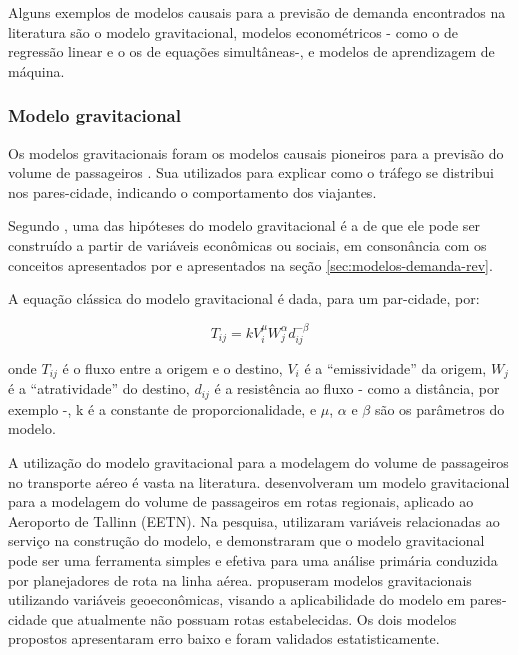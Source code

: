 \documentclass[a4paper,9pt,twocolumn,twoside,]{pinp}
\begin{document}
Alguns exemplos de modelos causais para a previsão de demanda
encontrados na literatura são o modelo gravitacional, modelos
econométricos - como o de regressão linear e o os de equações
simultâneas-, e modelos de aprendizagem de máquina.

\hypertarget{modelo-gravitacional}{%
\subsubsection{Modelo gravitacional}\label{modelo-gravitacional}}

Os modelos gravitacionais foram os modelos causais pioneiros para a
previsão do volume de passageiros \citep{grosche_gravity_2007}. Sua
utilizados para explicar como o tráfego se distribui nos pares-cidade,
indicando o comportamento dos viajantes.

Segundo \citet{grosche_gravity_2007}, uma das hipóteses do modelo
gravitacional é a de que ele pode ser construído a partir de variáveis
econômicas ou sociais, em consonância com os conceitos apresentados por
\citet{jorge-calderon_demand_1997} e
\citet{kanafani_transportation_1983} apresentados na seção
\ref{sec:modelos-demanda-rev}.

A equação clássica do modelo gravitacional é dada, para um par-cidade,
por:

\begin{equation}
T_{ij} = k V_i^\mu W_j^\alpha d_{ij}^{-\beta}
\end{equation}

onde \(T_{ij}\) é o fluxo entre a origem e o destino, \(V_i\) é a
``emissividade'' da origem, \(W_j\) é a ``atratividade'' do destino,
\(d_{ij}\) é a resistência ao fluxo - como a distância, por exemplo -, k
é a constante de proporcionalidade, e \(\mu\), \(\alpha\) e \(\beta\)
são os parâmetros do modelo.

A utilização do modelo gravitacional para a modelagem do volume de
passageiros no transporte aéreo é vasta na literatura.
\citet{nommik_developing_2016} desenvolveram um modelo gravitacional
para a modelagem do volume de passageiros em rotas regionais, aplicado
ao Aeroporto de Tallinn (EETN). Na pesquisa, utilizaram variáveis
relacionadas ao serviço na construção do modelo, e demonstraram que o
modelo gravitacional pode ser uma ferramenta simples e efetiva para uma
análise primária conduzida por planejadores de rota na linha aérea.
\citet{grosche_gravity_2007} propuseram modelos gravitacionais
utilizando variáveis geoeconômicas, visando a aplicabilidade do modelo
em pares-cidade que atualmente não possuam rotas estabelecidas. Os dois
modelos propostos apresentaram erro baixo e foram validados
estatisticamente.
\end{document}
